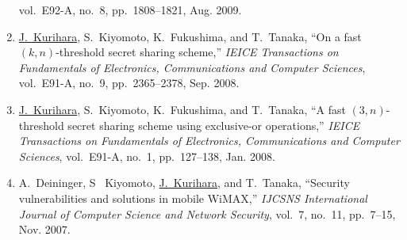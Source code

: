 \begin{enumerate}
    vol.~E92-A, no.~8, pp.~1808--1821, Aug. 2009.
  \item \underline{J.~Kurihara}, S.~Kiyomoto, K.~Fukushima, and
    T.~Tanaka, ``On a fast $(k,n)$-threshold secret sharing scheme,''
    \textit{IEICE Transactions on Fundamentals of Electronics, Communications and Computer Sciences},
    vol.~E91-A, no.~9, pp.~2365--2378, Sep. 2008.
  \item \underline{J.~Kurihara}, S.~Kiyomoto, K.~Fukushima, and
    T.~Tanaka, ``A fast $(3,n)$-threshold secret sharing scheme using
    exclusive-or operations,''
    \textit{IEICE Transactions on Fundamentals of Electronics, Communications and Computer Sciences},
    vol.~E91-A, no.~1, pp.~127--138, Jan. 2008.
  \item A.~Deininger, S~ Kiyomoto, \underline{J.~Kurihara}, and
    T.~Tanaka, ``Security vulnerabilities and solutions in mobile
    WiMAX,'' \textit{IJCSNS International Journal of Computer Science
    and Network Security}, vol.~7, no.~11, pp.~7--15, Nov. 2007.
\end{enumerate}
